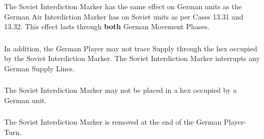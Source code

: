 \subsubsection{} The Soviet Interdiction Marker has the same effect on German units as the German Air Interdiction Marker has on Soviet units as per Cases 13.31 and 13.32. This effect lasts through \textbf{both} German Movement Phases.

\subsubsection{} In addition, the German Player may not trace Supply through the hex occupied by the Soviet Interdiction Marker. The Soviet Interdiction Marker interrupts any German Supply Lines.

\subsubsection{} The Soviet Interdiction Marker may not be placed in a hex occupied by a German unit.

\subsubsection{} The Soviet Interdiction Marker is removed at the end of the German Player-Turn.